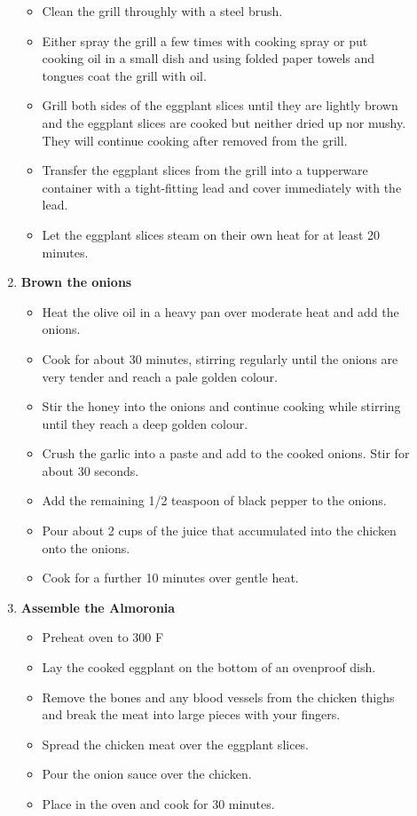 \documentclass[11pt,letterpaper]{article}
\newcommand \fileName {Almoronia}
\begin{document}
\begin{description}
\begin{enumerate}
\begin{itemize}
	\item Clean the grill throughly with a steel brush.
	\item Either spray the grill a few times with cooking spray or put cooking oil in a small dish and using folded paper towels and tongues coat the grill with oil.
	\item Grill both sides of the eggplant slices until they are lightly brown and the eggplant slices are cooked but neither dried up nor mushy. They will continue cooking after removed from the grill.
	\item Transfer the eggplant slices from the grill into a tupperware container with a tight-fitting lead and cover immediately with the lead.
	\item Let the eggplant slices steam on their own heat for at least 20 minutes.
	\end{itemize}
	\item {\bf Brown the onions}
	\begin{itemize}
	\item Heat the olive oil in a heavy pan over moderate heat and add the onions.
	\item Cook for about 30 minutes, stirring regularly until the onions are very tender and reach a pale golden colour.
	\item Stir the honey into the onions and continue cooking while stirring until they reach a deep golden colour. 
	\item Crush the garlic into a paste and add to the cooked onions. Stir for about 30 seconds.
	\item Add the remaining 1/2 teaspoon of black pepper to the onions.
	\item Pour about 2 cups of the juice that accumulated into the chicken onto the onions.
	\item Cook for a further 10 minutes over gentle heat.
	\end{itemize}
	\item {\bf Assemble the Almoronia}
	\begin{itemize}
	\item Preheat oven to 300 F
	\item Lay the cooked eggplant on the bottom of an ovenproof dish.
	\item Remove the bones and any blood vessels from the chicken thighs and break the meat into large pieces with your fingers.
	\item Spread the chicken meat over the eggplant slices.
	\item Pour the onion sauce over the chicken.
	\item Place in the oven and cook for 30 minutes.
	\end{itemize}
	\end{enumerate}
\end{description}

\end{document}
